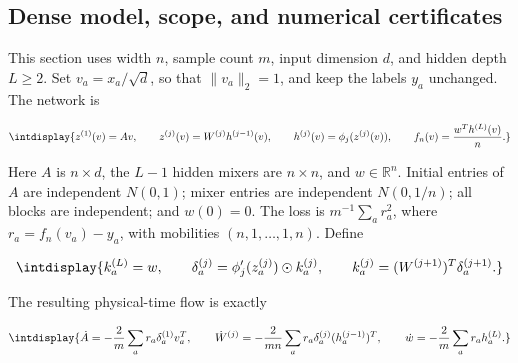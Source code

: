 \subsection{Dense model, scope, and numerical certificates}
\label{int:dense-model-and-certificates}


This section uses width \(n\), sample count \(m\), input dimension \(d\), and hidden depth \(L\ge2\). Set \(v_a=x_a/\sqrt d\), so that \(\|v_a\|_2=1\), and keep the labels \(y_a\) unchanged. The network is


\begingroup\renewcommand{\theHequation}{intdisplay.35}
\begin{equation*}
\intdisplay{
z^{(1)}(v)=Av,\qquad
z^{(j)}(v)=W^{(j)}h^{(j-1)}(v),\qquad
h^{(j)}(v)=\phi_j(z^{(j)}(v)),\qquad
f_n(v)=\frac{w^Th^{(L)}(v)}n.
}
\end{equation*}
\endgroup


Here \(A\) is \(n\times d\), the \(L-1\) hidden mixers are \(n\times n\), and \(w\in\mathbb R^n\). Initial entries of \(A\) are independent \(N(0,\allowbreak 1)\); mixer entries are independent \(N(0,\allowbreak 1/n)\); all blocks are independent; and \(w(0)=0\). The loss is \(m^{-1}\sum_a r_a^2\), where \(r_a=f_n(v_a)-y_a\), with mobilities \((n,\allowbreak 1,\allowbreak \ldots,\allowbreak 1,\allowbreak n)\). Define


\begingroup\renewcommand{\theHequation}{intdisplay.36}
\begin{equation*}
\intdisplay{
k_a^{(L)}=w,\qquad
\delta_a^{(j)}=\phi_j'(z_a^{(j)})\odot k_a^{(j)},\qquad
k_a^{(j)}=(W^{(j+1)})^T\delta_a^{(j+1)}.
}
\end{equation*}
\endgroup


The resulting physical-time flow is exactly


\begingroup\renewcommand{\theHequation}{intdisplay.37}
\begin{equation*}
\intdisplay{
\dot A=-\frac2m\sum_a r_a\delta_a^{(1)}v_a^T,\qquad
\dot W^{(j)}=-\frac2{mn}\sum_a r_a\delta_a^{(j)}(h_a^{(j-1)})^T,
\qquad \dot w=-\frac2m\sum_a r_ah_a^{(L)}.
}
\end{equation*}
\endgroup


